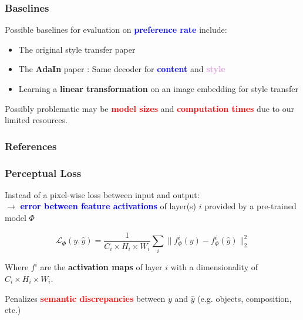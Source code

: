 \documentclass[11pt,xcolor=dvipsnames]{beamer}
\begin{document}
\begin{frame}
\frametitle{Baselines}

Possible baselines for evaluation on \textcolor{blue}{\textbf{preference rate}} include:
	\vspace{10pt}

\begin{itemize}
\item The original style transfer paper \cite{gatys}
	\vspace{10pt}
	\item The \textbf{AdaIn} paper \cite{adain}: Same decoder for \textbf{\textcolor{blue}{content}} and \textcolor{Plum}{\textbf{style}}
	\vspace{10pt} 
	\item Learning a \textbf{linear transformation} on an image embedding for style transfer \cite{linear}
	\vspace{10pt} 
	
\end{itemize}

Possibly problematic may be \textcolor{red}{\textbf{model sizes}} and \textcolor{red}{\textbf{computation times}} due to our limited resources.


\end{frame}

\begin{frame}[allowframebreaks]
        \frametitle{References}


        \printbibliography
\end{frame}

\begin{frame}
	\frametitle{Perceptual Loss}
	
Instead of a pixel-wise loss between input and output: \\
$\rightarrow$ \textbf{\textcolor{blue}{error between feature activations}} of layer(s) $i$ provided by a pre-trained model $\Phi$
\vspace{10pt}

\begin{equation*}
	\mathcal{L}_{\Phi}(y, \hat{y}) = \frac{1}{C_i \times H_i \times W_i} \sum_i\lVert f^i_{\Phi}(y) - f^i_{\Phi}(\hat{y}) \rVert^2_2
\end{equation*}
\vspace{10pt}

Where $f^i$ are the \textbf{activation maps} of layer $i$ with a dimensionality of $C_i \times H_i \times W_i$.
\vspace{10pt}

Penalizes \textcolor{red}{\textbf{semantic discrepancies}} between $y$ and $\hat{y}$ (e.g. objects, composition, etc.)

\end{frame}
\end{document}
